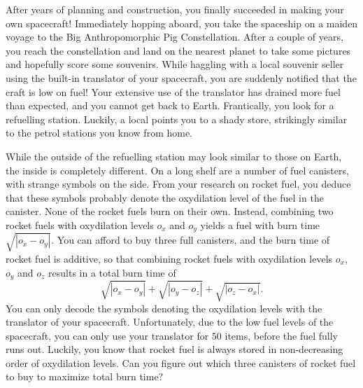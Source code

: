 \problemname{}


\newcommand{\maxn}{2 \cdot 10^5}
\newcommand{\maxa}{10^6}
\newcommand{\maxq}{50}

After years of planning and construction, you finally succeeded in making your own spacecraft! Immediately hopping aboard, you take the spaceship on a maiden voyage to the Big Anthropomorphic Pig Constellation. After a couple of years, you reach the constellation and land on the nearest planet to take some pictures and hopefully score some souvenirs. While haggling with a local souvenir seller using the built-in translator of your spacecraft, you are suddenly notified that the craft is low on fuel! Your extensive use of the translator has drained more fuel than expected, and you cannot get back to Earth. Frantically, you look for a refuelling station. Luckily, a local points you to a shady store, strikingly similar to the petrol stations you know from home.

While the outside of the refuelling station may look similar to those on Earth, the inside is completely different. On a long shelf are a number of fuel canisters, with strange symbols on the side. From your research on rocket fuel, you deduce that these symbols probably denote the oxydilation level of the fuel in the canister. None of the rocket fuels burn on their own. Instead, combining two rocket fuels with oxydilation levels $o_x$ and $o_y$ yields a fuel with burn time $\sqrt{|o_x-o_y|}$. You can afford to buy three full canisters, and the burn time of rocket fuel is additive, so that combining rocket fuels with oxydilation levels $o_x$, $o_y$ and $o_z$ results in a total burn time of
\[\sqrt{|o_x-o_y|} + \sqrt{|o_y-o_z|} + \sqrt{|o_z-o_x|}.\]
You can only decode the symbols denoting the oxydilation levels with the translator of your spacecraft. Unfortunately, due to the low fuel levels of the spacecraft, you can only use your translator for $\maxq$ items, before the fuel fully runs out. Luckily, you know that rocket fuel is always stored in non-decreasing order of oxydilation levels. Can you figure out which three canisters of rocket fuel to buy to maximize total burn time?

